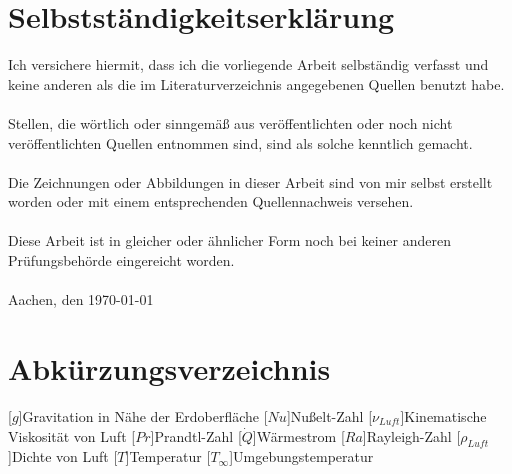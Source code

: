 \documentclass[a4paper,12pt]{scrreprt}
\begin{document}
\chapter*{Selbstständigkeitserklärung}
\thispagestyle{empty}	%
Ich versichere hiermit, dass ich die vorliegende Arbeit selbständig verfasst und keine anderen als die im Literaturverzeichnis angegebenen Quellen benutzt habe.\\ \\
Stellen, die wörtlich oder sinngemäß aus veröffentlichten oder noch nicht veröffentlichten Quellen entnommen sind, sind als solche kenntlich gemacht.\\ \\ Die Zeichnungen oder Abbildungen in dieser Arbeit sind von mir selbst erstellt worden oder mit einem entsprechenden Quellennachweis versehen.\\ \\ Diese Arbeit ist in gleicher oder ähnlicher Form noch bei keiner anderen Prüfungsbehörde eingereicht worden.\\ \\[2ex]
Aachen, den \today \hspace{4cm} \dotfill 
\tableofcontents

\clearpage
\chapter*{Abkürzungsverzeichnis}\label{abkuerzungsverzeichnis}
\begin{acronym}[YTM]
\setlength{\itemsep}{-\parsep}

[$g$]{\hspace{1cm}Gravitation in Nähe der Erdoberfläche}
[$Nu$]{\hspace{1cm}Nußelt-Zahl}
[$\nu_{Luft}$]{\hspace{1cm}Kinematische Viskosität von Luft}
[$Pr$]{\hspace{1cm}Prandtl-Zahl}
[$\dot Q$]{\hspace{1cm}Wärmestrom}
[$Ra$]{\hspace{1cm}Rayleigh-Zahl}
[$\rho_{Luft}$]{\hspace{1cm}Dichte von Luft}
[$T$]{\hspace{1cm}Temperatur}
[$T_{\infty}$]{\hspace{1cm}Umgebungstemperatur}

\end{acronym}
\end{document}
